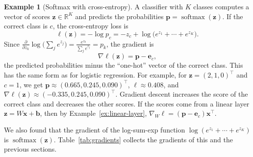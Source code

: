 \documentclass[11pt]{article}
\theoremstyle{definition}
\newtheorem{example}[definition]{Example}
\theoremstyle{plain}
\theoremstyle{remark}
\DeclareMathOperator{\softmax}{softmax}
\begin{document}
\begin{example}[Softmax with cross-entropy]\label{ex:softmax-ce}
    A classifier with $K$ classes computes a vector of scores $\mathbf{z} \in \mathbb{R}^K$ and predicts the probabilities $\mathbf{p} = \softmax(\mathbf{z})$. If the correct class is $c$, the cross-entropy loss is
    \[\ell(\mathbf{z}) = -\log p_c = -z_c + \log\big(e^{z_1} + \cdots + e^{z_K}\big).\]
    Since $\frac{\partial}{\partial z_k} \log\big(\sum_j e^{z_j}\big) = \frac{e^{z_k}}{\sum_j e^{z_j}} = p_k$, the gradient is
    \[\nabla \ell(\mathbf{z}) = \mathbf{p} - \mathbf{e}_c,\]
    the predicted probabilities minus the ``one-hot'' vector of the correct class. This has the same form as for logistic regression. For example, for $\mathbf{z} = (2, 1, 0)^\top$ and $c = 1$, we get $\mathbf{p} \approx (0.665, 0.245, 0.090)^\top$, $\ell \approx 0.408$, and $\nabla\ell(\mathbf{z}) \approx (-0.335, 0.245, 0.090)^\top$. Gradient descent increases the score of the correct class and decreases the other scores. If the scores come from a linear layer $\mathbf{z} = W\mathbf{x} + \mathbf{b}$, then by Example~\ref{ex:linear-layer}, $\nabla_W \ell = (\mathbf{p} - \mathbf{e}_c)\mathbf{x}^\top$.
\end{example}

We also found that the gradient of the log-sum-exp function $\log(e^{z_1} + \cdots + e^{z_K})$ is $\softmax(\mathbf{z})$. Table~\ref{tab:gradients} collects the gradients of this and the previous sections.
\end{document}

